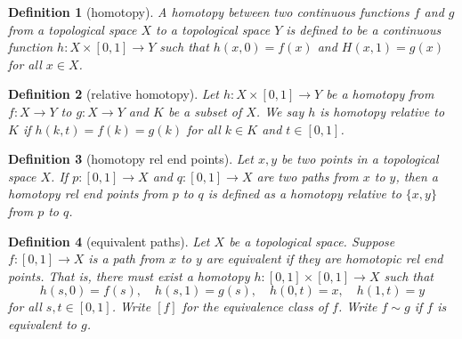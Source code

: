 \documentclass{report}
\newtheorem{definition}{Definition}[section]
\theoremstyle{nonumberplain}
\begin{document}
\begin{definition}[homotopy]
	A \emph{homotopy} between two continuous functions $f$ and $g$ from a topological space $X$ to a topological space $Y$ is defined to be a continuous function $h: X \times[0,1] \rightarrow Y$ such that $h(x, 0)=f(x)$ and $H(x, 1)=g(x)$ for all $x \in X$.
\end{definition}
\begin{definition}[relative homotopy]
	Let $h: X \times[0,1] \rightarrow Y$ be a homotopy from $f:X\to Y$ to $g:X\to Y$ and $K$ be a subset of $X$. We say $h$ is \emph{homotopy relative to $K$} if $h(k, t)=f(k)=g(k)$ for all $k \in K$ and $t \in[0,1]$. 
\end{definition}
\begin{definition}[homotopy rel end points]
	Let $x,y$ be two points in a topological space $X$. If $p:[0,1]\to X$ and $q:[0,1]\to X$ are two paths from $x$ to $y$, then a \emph{homotopy rel end points from $p$ to $q$} is defined as a homotopy relative to $\{x, y\}$ from $p$ to $q$.
\end{definition}
\begin{definition}[equivalent paths]
	Let $X$ be a topological space. Suppose $f: [0,1] \longrightarrow X$ is a path from $x$ to $y$ are \emph{equivalent} if they are homotopic rel end points. That is, there must exist a homotopy $h: [0,1] \times [0,1] \longrightarrow X$ such that
	$$
	h(s, 0)=f(s), \quad h(s, 1)=g(s), \quad h(0, t)=x, \quad h(1, t)=y
	$$
	for all $s,t \in [0,1]$. Write $[f]$ for the equivalence class of $f$. Write $f\sim g$ if $f$ is equivalent to $g$.
\end{definition}
\end{document}
